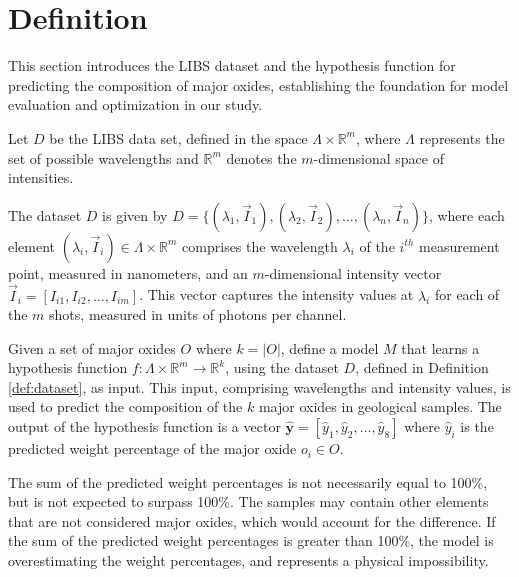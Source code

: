 \section{Definition}\label{sec:definition}
This section introduces the LIBS dataset and the hypothesis function for predicting the composition of major oxides, establishing the foundation for model evaluation and optimization in our study.

\begin{definition}\label{def:dataset}
    Let $D$ be the LIBS data set, defined in the space $\Lambda \times \mathbb{R}^m$, where $\Lambda$ represents the set of possible wavelengths and $\mathbb{R}^m$ denotes the $m$-dimensional space of intensities.

    The dataset $D$ is given by $D = \{ (\lambda_1, \vec{I}_1), (\lambda_2, \vec{I}_2), \ldots, (\lambda_n, \vec{I}_n) \}$, where each element $(\lambda_i, \vec{I}_i) \in \Lambda \times \mathbb{R}^{m}$ comprises the wavelength $\lambda_i$ of the $i^{th}$ measurement point, measured in nanometers, and an $m$-dimensional intensity vector $\vec{I}_i = [I_{i1}, I_{i2}, \ldots, I_{im}]$.
    This vector captures the intensity values at $\lambda_i$ for each of the $m$ shots, measured in units of photons per channel.
\end{definition}

\begin{definition}\label{def:hypothesis_function}
    Given a set of major oxides \(O\) where \(k=|O|\), define a model \(M\) that learns a hypothesis function \(f: \Lambda \times \mathbb{R}^m \rightarrow \mathbb{R}^k\), using the dataset \(D\), defined in Definition \ref{def:dataset}, as input. 
    This input, comprising wavelengths and intensity values, is used to predict the composition of the \(k\) major oxides in geological samples. 
    The output of the hypothesis function is a vector \(\mathbf{\hat{y}} = [\hat{y}_{1}, \hat{y}_{2}, \ldots, \hat{y}_{8}]\) where \(\hat{y}_{i}\) is the predicted weight percentage of the major oxide \(o_i \in O\).
\end{definition}

The sum of the predicted weight percentages is not necessarily equal to 100\%, but is not expected to surpass 100\%.
The samples may contain other elements that are not considered major oxides, which would account for the difference.
If the sum of the predicted weight percentages is greater than 100\%, the model is overestimating the weight percentages, and represents a physical impossibility.

